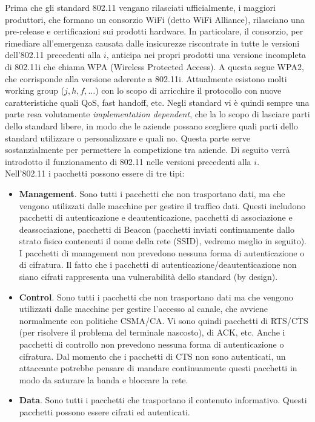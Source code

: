 Prima che gli standard 802.11 vengano rilasciati ufficialmente, i maggiori produttori, che formano un consorzio WiFi (detto WiFi Alliance), rilasciano una pre-release e certificazioni sui prodotti hardware. In particolare, il consorzio, per rimediare all'emergenza causata dalle insicurezze riscontrate in tutte le versioni dell'802.11 precedenti alla $i$, anticipa nei propri prodotti una versione incompleta di 802.11i che chiama WPA (Wireless Protected Access). A questa segue WPA2, che corrisponde alla versione aderente a 802.11i. Attualmente esistono molti working group ($j,h,f,\dots$) con lo scopo di arricchire il protocollo con nuove caratteristiche quali QoS, fast handoff, etc. Negli standard vi è quindi sempre una parte resa volutamente \textit{implementation dependent}, che la lo scopo di lasciare parti dello standard libere, in modo che le aziende possano scegliere quali parti dello standard utilizzare o personalizzare e quali no. Questa parte serve sostanzialmente per permettere la competizione tra aziende. Di seguito verrà introdotto il funzionamento di 802.11 nelle versioni precedenti alla $i$.\\
Nell'802.11 i pacchetti possono essere di tre tipi:
\begin{itemize}
	\item \textbf{Management}. Sono tutti i pacchetti che non trasportano dati, ma che vengono utilizzati dalle macchine per gestire il traffico dati. Questi includono pacchetti di autenticazione e deautenticazione, pacchetti di associazione e deassociazione, pacchetti di Beacon (pacchetti inviati continuamente dallo strato fisico contenenti il nome della rete (SSID), vedremo meglio in seguito). I pacchetti di management non prevedono nessuna forma di autenticazione o di cifratura. Il fatto che i pacchetti di autenticazione/deautenticazione non siano cifrati rappresenta una vulnerabilità dello standard (by design).
	\item \textbf{Control}. Sono tutti i pacchetti che non trasportano dati ma che vengono utilizzati dalle macchine per gestire l'accesso al canale, che avviene normalmente con politiche CSMA/CA. Vi sono quindi pacchetti di RTS/CTS (per risolvere il problema del terminale nascosto), di ACK, etc. Anche i pacchetti di controllo non prevedono nessuna forma di autenticazione o cifratura. Dal momento che i pacchetti di CTS non sono autenticati, un attaccante potrebbe pensare di mandare continuamente questi pacchetti in modo da saturare la banda e bloccare la rete.
	\item \textbf{Data}. Sono tutti i pacchetti che trasportano il contenuto informativo. Questi pacchetti possono essere cifrati ed autenticati.
\end{itemize}
